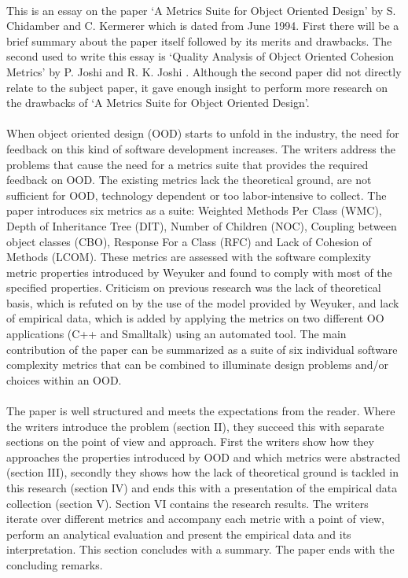 \paragraph{}
This is an essay on the paper `A Metrics Suite for Object Oriented Design' \autocite{METRICS_SUITE} by S. Chidamber and C.
Kermerer which is dated from June 1994. First there will be a brief summary about the paper itself followed by
its merits and drawbacks. The second used to write this essay is
`Quality Analysis of Object Oriented Cohesion Metrics' by P. Joshi and R. K. Joshi \autocite{JOSHI}.
Although the second paper did not directly relate to the subject paper, it gave enough insight to perform more research
on the drawbacks of `A Metrics Suite for Object Oriented Design'.

\paragraph{}
When object oriented design (OOD) starts to unfold in the industry, the need for feedback on this kind of software
development increases. The writers address the problems that cause the need for a metrics suite that provides the
required feedback on OOD. The existing metrics lack the theoretical ground, are not sufficient for OOD,
technology dependent or too labor-intensive to collect.
The paper introduces six metrics as a suite: Weighted Methods Per Class (WMC), Depth of Inheritance Tree (DIT),
Number of Children (NOC), Coupling between object classes (CBO), Response For a Class (RFC) and Lack of
Cohesion of Methods (LCOM). These metrics are assessed with the software complexity metric properties introduced by
Weyuker \autocite{WEYUKER} and found to comply with most of the specified properties.
Criticism on previous research was the lack of theoretical basis, which is refuted on by the use of the
model provided by Weyuker, and lack of empirical data, which is added by applying the metrics on two different OO
applications (C++ and Smalltalk) using an automated tool. The main contribution of the paper can be summarized as a
suite of six individual software complexity metrics that can be combined to illuminate design problems and/or choices
within an OOD.

\paragraph{}
The paper is well structured and meets the expectations from the reader. Where the writers introduce the problem
(section II), they succeed this with separate sections on the point of view and approach. First the writers show how they
approaches the properties introduced by OOD and which metrics were abstracted (section III), secondly they shows how the
lack of theoretical ground is tackled in this research (section IV) and ends this with a presentation of the empirical
data collection (section V). Section VI contains the research results. The writers iterate over different metrics and
accompany each metric with a point of view, perform an analytical evaluation and present the empirical data and its
interpretation. This section concludes with a summary. The paper ends with the concluding remarks.

